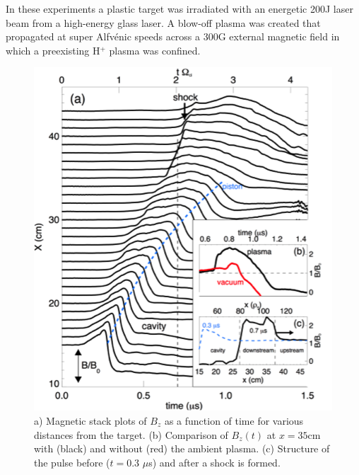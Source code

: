 \documentclass[11pt]{article}
\begin{document}
In these experiments a plastic target was irradiated with an energetic
200J laser beam from a high-energy glass laser. A blow-off plasma
was created that propagated at super Alfv\'{e}nic speeds across a 300G
external magnetic field in which a preexisting H$^+$ plasma was confined.

\begin{figure}[!htbp]
\centerline{\includegraphics[width=3.0truein]{shock1}}
\caption{a) Magnetic stack plots of $B_{z}$ as a function of time for
  various distances from the target. (b) Comparison of $B_z(t)$ at $x
  = 35$cm with (black) and without (red) the ambient plasma. (c) Structure
  of the pulse before ($t = 0.3$ $\mu$s) and after a shock is formed.}\label{shock1}
\end{figure}
\end{document}
